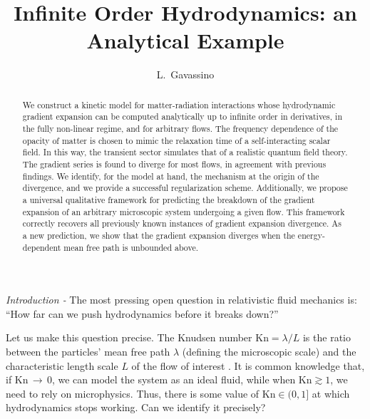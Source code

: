 \documentclass[a4paper, amsfonts, amssymb, amsmath, reprint, showkeys, twoside,notitlepage]{revtex4-2}
\newcommand{\Kn}{\text{Kn}}
\begin{document}
\title{Infinite Order Hydrodynamics: an Analytical Example}
\author{ L.~Gavassino}


\begin{abstract}
We construct a kinetic model for matter-radiation interactions whose hydrodynamic gradient expansion can be computed analytically up to infinite order in derivatives, in the fully non-linear regime, and for arbitrary flows. The frequency dependence of the opacity of matter is chosen to mimic the relaxation time of a self-interacting scalar field. In this way, the transient sector simulates that of a realistic quantum field theory. The gradient series is found to diverge for most flows, in agreement with previous findings. We identify, for the model at hand, the mechanism at the origin of the divergence, and we provide a successful regularization scheme. Additionally, we propose a universal qualitative framework for predicting the breakdown of the gradient expansion of an arbitrary microscopic system undergoing a given flow. This framework correctly recovers all previously known instances of gradient expansion divergence. As a new prediction, we show that the gradient expansion diverges when the energy-dependent mean free path is unbounded above.
\end{abstract} 



\maketitle


\textit{Introduction -} 
The most pressing open question in relativistic fluid mechanics is: ``How far can we push hydrodynamics before it breaks down?'' \cite{Noronha-Hostler:2015wft,Strickland:2014pga,HellerAttractors2015,Alqahtani:2017mhy,Romatschke:2017acs,Romatschke2017,Romatschke2018FarFrom,FlorkowskiReview2018,DenicolNoronhaAttractor2019lio,HellerGradexp2021,Most:2021uck,MostAlfordNoronhaBulk2021zvc,HellerSingulant2022,Plumberg2022,MullinsDenicolCosmology,WagnerGavassino2023jgq,GavassinoFarFromBulk2023,GavassinoLargeFlux2023jyp,Aniceto:2024pyc,NoronhaSmallSystems2024dtq}

Let us make this question precise. The Knudsen number $\Kn=\lambda/L$ is the ratio between the particles' mean free path $\lambda$ (defining the microscopic scale) and the characteristic length scale $L$ of the flow of interest \cite{Hadjiconstantinou2006,Denicol2012Boltzmann}. It is common knowledge \cite{huang_book} that, if $\Kn \,{\rightarrow}\, 0$, we can model the system as an ideal fluid, while when $\Kn \gtrsim 1$, we need to rely on microphysics. Thus, there is some value of $\Kn \in (0,1]$ at which hydrodynamics stops working. Can we identify it precisely?
\end{document}
